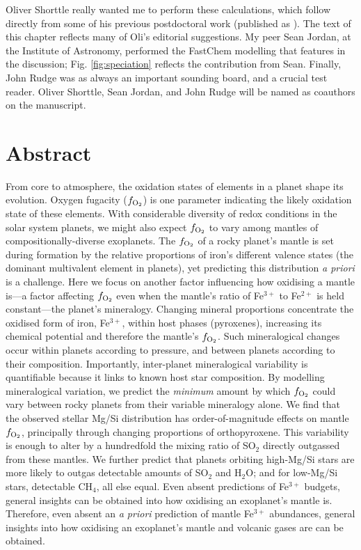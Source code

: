 Oliver Shorttle really wanted me to perform these calculations, which follow directly from some of his previous postdoctoral work (published as \citealt{stolper_effects_2020}). The text of this chapter reflects many of Oli's editorial suggestions. My peer Sean Jordan, at the Institute of Astronomy, performed the FastChem modelling that features in the discussion; Fig. \ref{fig:speciation} reflects the contribution from Sean. Finally, John Rudge was as always an important sounding board, and a crucial test reader. Oliver Shorttle, Sean Jordan, and John Rudge will be named as coauthors on the manuscript.



\section*{Abstract}

From core to atmosphere, the oxidation states of elements in a planet shape its evolution. Oxygen fugacity ($f_{\rm O_2}$) is one parameter indicating the likely oxidation state of these elements. With considerable diversity of redox conditions in the solar system planets, we might also expect $f_{\rm O_2}$ to vary among mantles of compositionally-diverse exoplanets. The $f_{\rm O_2}$ of a rocky planet's mantle is set during formation by the relative proportions of iron's different valence states (the dominant multivalent element in planets), yet predicting this distribution \textit{a priori} is a challenge. Here we focus on another factor influencing how oxidising a mantle is---a factor affecting $f_{\rm O_2}$ even when the mantle’s ratio of Fe$^{3+}$ to Fe$^{2+}$ is held constant---the planet’s mineralogy. Changing mineral proportions concentrate the oxidised form of iron, Fe$^{3+}$, within host phases (pyroxenes), increasing its chemical potential and therefore the mantle's $f_{\rm O_2}$. Such mineralogical changes occur within planets according to pressure, and between planets according to their composition. Importantly, inter-planet mineralogical variability is quantifiable because it links to known host star composition. By modelling mineralogical variation, we predict the \textit{minimum} amount by which $f_{\rm O_2}$ could vary between rocky planets from their variable mineralogy alone. We find that the observed stellar Mg/Si distribution has order-of-magnitude effects on mantle $f_{\rm O_2}$, principally through changing proportions of orthopyroxene. This variability is enough to alter by a hundredfold the mixing ratio of SO$_2$ directly outgassed from these mantles. We further predict that planets orbiting high-Mg/Si stars are more likely to outgas detectable amounts of SO$_2$ and H$_2$O; and for low-Mg/Si stars, detectable CH$_4$, all else equal. Even absent predictions of Fe$^{3+}$ budgets, general insights can be obtained into how oxidising an exoplanet’s mantle is. Therefore, even absent an \textit{a priori} prediction of mantle Fe$^{3+}$ abundances, general insights into how oxidising an exoplanet’s mantle and volcanic gases are can be obtained.

